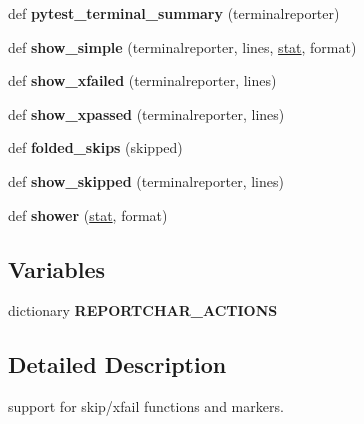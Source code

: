 \begin{DoxyCompactItemize}
def {\bfseries pytest\+\_\+terminal\+\_\+summary} (terminalreporter)
\item 
\mbox{\label{namespace__pytest_1_1skipping_a2774f5908017b70a96240e8a7ec1ee89}} 
def {\bfseries show\+\_\+simple} (terminalreporter, lines, \hyperlink{structstat}{stat}, format)
\item 
\mbox{\label{namespace__pytest_1_1skipping_a4572bbfd5ba0fe79d39f038954bf2105}} 
def {\bfseries show\+\_\+xfailed} (terminalreporter, lines)
\item 
\mbox{\label{namespace__pytest_1_1skipping_af695f8c32607a4369bed6062192938ca}} 
def {\bfseries show\+\_\+xpassed} (terminalreporter, lines)
\item 
\mbox{\label{namespace__pytest_1_1skipping_a9a4e6b4c59386d8ade7a5213b4fa18ef}} 
def {\bfseries folded\+\_\+skips} (skipped)
\item 
\mbox{\label{namespace__pytest_1_1skipping_aadea15f7f3828fde4996a42c015e5557}} 
def {\bfseries show\+\_\+skipped} (terminalreporter, lines)
\item 
\mbox{\label{namespace__pytest_1_1skipping_aedbb61c1b35b939f32431a1b6891a93a}} 
def {\bfseries shower} (\hyperlink{structstat}{stat}, format)
\end{DoxyCompactItemize}
\subsection*{Variables}
\begin{DoxyCompactItemize}
\item 
dictionary {\bfseries R\+E\+P\+O\+R\+T\+C\+H\+A\+R\+\_\+\+A\+C\+T\+I\+O\+NS}
\end{DoxyCompactItemize}


\subsection{Detailed Description}
\begin{DoxyVerb}support for skip/xfail functions and markers. \end{DoxyVerb}
 

